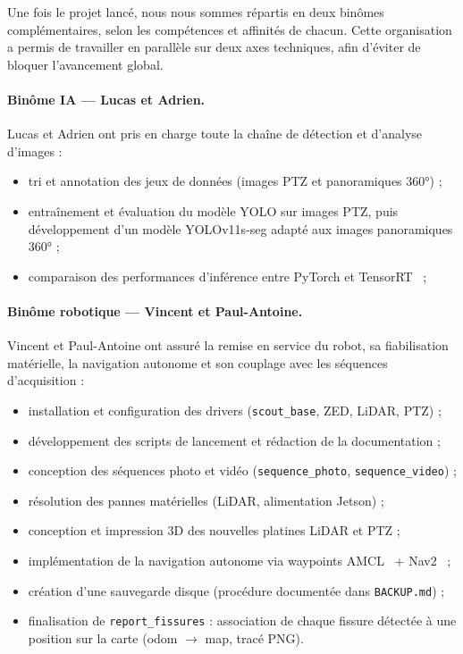 \documentclass[12pt,a4paper]{article}
\begin{document}
Une fois le projet lancé, nous nous sommes répartis en deux binômes complémentaires, selon les compétences et affinités de chacun. Cette organisation a permis de travailler en parallèle sur deux axes techniques, afin d'éviter de bloquer l'avancement global.

\paragraph{Binôme IA — Lucas et Adrien.}
Lucas et Adrien ont pris en charge toute la chaîne de détection et d'analyse d'images :
\begin{itemize}
    \item tri et annotation des jeux de données (images PTZ et panoramiques 360°) ;
    \item entraînement et évaluation du modèle YOLO sur images PTZ, puis développement d'un modèle YOLOv11s-seg adapté aux images panoramiques 360° ;
    \item comparaison des performances d'inférence entre PyTorch et TensorRT~\cite{tensorrt,jetson_orin} ;
\end{itemize}

\paragraph{Binôme robotique — Vincent et Paul-Antoine.}
Vincent et Paul-Antoine ont assuré la remise en service du robot, sa fiabilisation matérielle, la navigation autonome et son couplage avec les séquences d'acquisition :
\begin{itemize}
    \item installation et configuration des drivers (\texttt{scout\_base}, ZED, LiDAR, PTZ) ;
    \item développement des scripts de lancement et rédaction de la documentation ;
    \item conception des séquences photo et vidéo (\texttt{sequence\_photo}, \texttt{sequence\_video}) ;
    \item résolution des pannes matérielles (LiDAR, alimentation Jetson) ;
    \item conception et impression 3D des nouvelles platines LiDAR et PTZ ;
    \item implémentation de la navigation autonome via waypoints AMCL~\cite{nav2_amcl_docs} + Nav2~\cite{nav2} ;
    \item création d'une sauvegarde disque (procédure documentée dans \texttt{BACKUP.md}) ;
    \item finalisation de \texttt{report\_fissures} : association de chaque fissure détectée à une position sur la carte (odom $\rightarrow$ map, tracé PNG).
\end{itemize}
\end{document}
